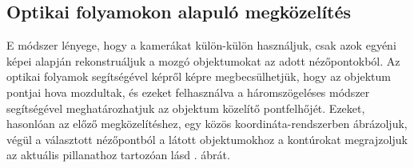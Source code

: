 \subsection{Optikai folyamokon alapuló megközelítés}

E módszer lényege, hogy a kamerákat külön-külön használjuk, csak azok egyéni képei alapján rekonstruáljuk a mozgó objektumokat az adott nézőpontokból. Az optikai folyamok segítségével képről képre megbecsülhetjük, hogy az objektum pontjai hova mozdultak, és ezeket felhasználva a háromszögeléses módszer segítségével meghatározhatjuk az objektum közelítő pontfelhőjét. Ezeket, hasonlóan az előző megközelítéshez, egy közös koordináta-rendszerben ábrázoljuk, végül a választott nézőpontból a látott objektumokhoz a kontúrokat megrajzoljuk az aktuális pillanathoz tartozóan lásd . ábrát.

